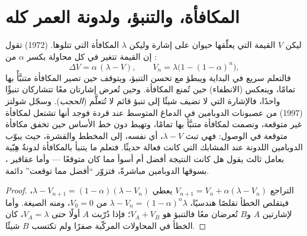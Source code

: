 \section{المكافأة، والتنبؤ، ولدونة العمر كله}

\begin{proposition}\label{prop:b3:learning-memory:rescorla}
ليكن $V$ القيمة التي يعلّقها حيوان على إشارة وليكن $\lambda$
المكافأة التي تتلوها.  (1972) تقول إن
القيمة تتغير في كل محاولة بكسر $\alpha$ من \emph{}:
\[
\Delta V = \alpha\,(\lambda - V), \qquad
V_{n} = \lambda\bigl(1 - (1-\alpha)^{n}\bigr) ,
\]
فالتعلم سريع في البداية ويبطؤ مع تحسن التنبؤ، ويتوقف حين
تصير المكافأة متنبَّأً بها تمامًا، وينعكس (الانطفاء) حين
تُمنع المكافأة. وحين تُعرض إشارتان معًا تتشاركان تنبؤًا
واحدًا، فالإشارة التي لا تضيف شيئًا إلى تنبؤ قائم لا
تُتعلَّم (\emph{الحجب}). وسجّل شولتز (1997) من عصبونات
الدوبامين في الدماغ المتوسط عند قردة فوجد أنها تشتعل
لمكافأة غير متوقعة، وتصمت لمكافأة متنبَّأ بها تمامًا، وتهبط
دون خط الأساس حين تخفق مكافأة متوقعة في الوصول: فهي تبث
$\lambda - V$، أي  نفسه، إلى المخطط والقشرة، حيث
يبوّب الدوبامين اللدونة عند المشابك التي كانت فعالة حديثًا.
فتعلم ما يتنبأ بالمكافأة لدونةٌ هِبّية بعامل ثالث يقول هل
كانت النتيجة أفضل أم أسوأ مما كان متوقعًا --- وأما عقاقير
، بسوقها الدوبامين مباشرةً، فتزوّر ``أفضل مما توقعت''
دائمة.
\end{proposition}
\begin{proof}
التراجع $V_{n+1} = V_{n} + \alpha(\lambda - V_{n})$ يعطي
$\lambda - V_{n+1} = (1-\alpha)(\lambda - V_{n})$، فيتقلص الخطأ
تقلصًا هندسيًا، $\lambda - V_{n} = (1-\alpha)^{n}\lambda$ من $V_{0} =
0$، ومنه الصيغة. وأما لإشارتين $A$ و$B$ تُعرضان معًا
فالتنبؤ هو $V_{A} + V_{B}$؛ فإذا دُرّبت $A$ أولًا حتى
$V_{A} = \lambda$، كان الخطأ في المحاولات المركّبة صفرًا ولم
تكتسب $B$ شيئًا.
\end{proof}

